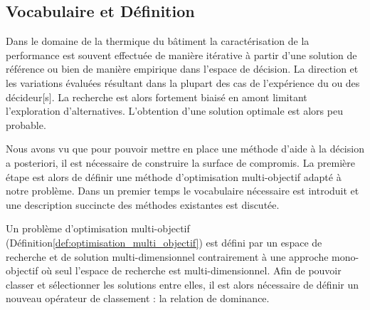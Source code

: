 \subsection{Vocabulaire et Définition} %
\label{sub:vocabulaire_et_definition}
Dans le domaine de la thermique du bâtiment la caractérisation
de la performance est souvent effectuée de manière itérative à partir d’une solution
de référence ou bien de manière empirique dans l’espace de décision. La direction et
les variations évaluées résultant dans la plupart des cas de l’expérience du ou des
décideur[s]. La recherche est alors fortement biaisé en amont limitant l’exploration
d’alternatives. L’obtention d’une solution optimale est alors peu probable.

Nous avons vu que pour pouvoir mettre en place une méthode d’aide à la décision a posteriori, il
est nécessaire de construire la surface de compromis. La première étape est alors
de définir une méthode d’optimisation multi-objectif adapté à notre problème.
Dans un premier temps le vocabulaire nécessaire est introduit et une
description succincte des méthodes existantes est discutée.


Un problème d’optimisation multi-objectif (Définition\ref{def:optimisation_multi_objectif})
est défini par un espace de recherche et de solution multi-dimensionnel contrairement à
une approche mono-objectif où seul l’espace de recherche est multi-dimensionnel.
Afin de pouvoir classer et sélectionner les solutions entre elles, il est alors nécessaire de définir un
nouveau opérateur de classement : la relation de dominance.

